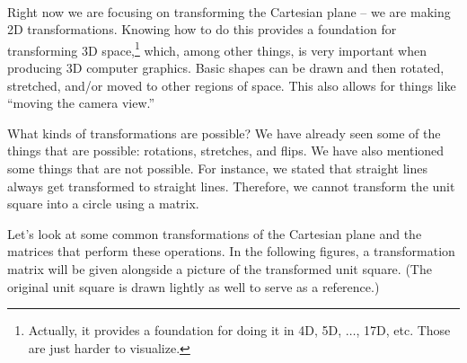 {\enlargethispage{3\baselineskip}
\begin{myfigure}
\begin{center}
\end{center}
\label{fig:transf_2_2}
\end{myfigure}
\baselineskip}\\
\clearpage

Right now we are focusing on transforming the Cartesian plane -- we are making 2D transformations. Knowing how to do this provides a foundation for transforming 3D space,\footnote{Actually, it provides a foundation for doing it in 4D, 5D, $\ldots$, 17D, etc. Those are just harder to visualize.} which, among other things, is very important when producing 3D computer graphics. Basic shapes can be drawn and then rotated, stretched, and/or moved to other regions of space. This also allows for things like ``moving the camera view.'' 

What kinds of transformations are possible? We have already seen some of the things that are possible: rotations, stretches, and flips. We have also mentioned some things that are not possible. For instance, we stated that straight lines always get transformed to straight lines. Therefore, we cannot transform the unit square into a circle using a matrix.

Let's look at some common transformations of the Cartesian plane and the matrices that perform these operations. In the following figures, a transformation matrix will be given alongside a picture of the transformed unit square. (The original unit square is drawn lightly as well to serve as a reference.)\\

